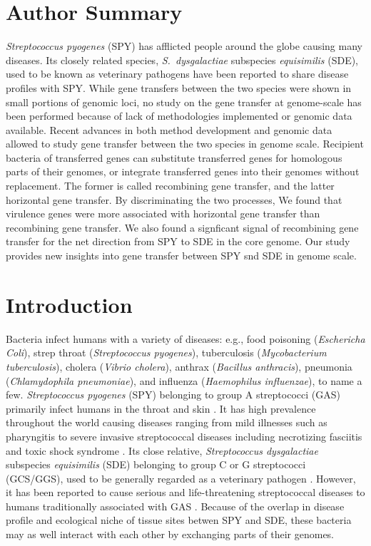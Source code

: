 \documentclass[10pt]{article}
\let\citep\cite
\begin{document}
\section*{Author Summary}

\textit{Streptococcus pyogenes} (SPY) has afflicted people around the globe
causing many diseases. Its closely related species, \textit{S.\ dysgalactiae}
subspecies \textit{equisimilis} (SDE), used to be known as veterinary pathogens
have been reported to share disease profiles with SPY.  While gene transfers
between the two species were shown in small portions of genomic loci, no study
on the gene transfer at genome-scale has been performed because of lack of
methodologies implemented or genomic data available. Recent advances in both
method development and genomic data allowed to study gene transfer between the
two species in genome scale.  Recipient bacteria of transferred genes can
substitute transferred genes for homologous parts of their genomes, or integrate
transferred genes into their genomes without replacement.  The former is called
recombining gene transfer, and the latter horizontal gene transfer. By
discriminating the two processes, We found that virulence genes were more
associated with horizontal gene transfer than recombining gene transfer.  We
also found a signficant signal of recombining gene transfer for the net
direction from SPY to SDE in the core genome.  Our study provides new insights
into gene transfer between SPY snd SDE in genome scale.  

\section*{Introduction}

Bacteria infect humans with a variety of diseases: e.g., food poisoning
(\textit{Eschericha Coli}), strep throat (\textit{Streptococcus pyogenes}),
tuberculosis (\textit{Mycobacterium tuberculosis}), cholera (\textit{Vibrio
cholera}), anthrax (\textit{Bacillus anthracis}), pneumonia
(\textit{Chlamydophila pneumoniae}), and influenza (\textit{Haemophilus
influenzae}), to name a few.  \textit{Streptococcus pyogenes} (SPY) belonging to
group A streptococci (GAS) primarily infect humans in the throat and skin
\citep{Broyles2009}. It has high prevalence throughout the world causing
diseases ranging from mild illnesses such as pharyngitis to severe invasive
streptococcal diseases including necrotizing fasciitis and toxic shock syndrome
\citep{Cunningham2000a}.  Its close relative, \textit{Streptococcus
dysgalactiae} subspecies \textit{equisimilis} (SDE) belonging to group C or G
streptococci (GCS/GGS), used to be generally regarded as a veterinary pathogen
\citep{Vandamme1996}. However, it has been reported to cause serious and
life-threatening streptococcal diseases to humans traditionally associated with
GAS \citep{Brandt2009}.  Because of the overlap in disease profile and
ecological niche of tissue sites betwen SPY and SDE, these bacteria may as
well interact with each other by exchanging parts of their genomes.  
\end{document}
